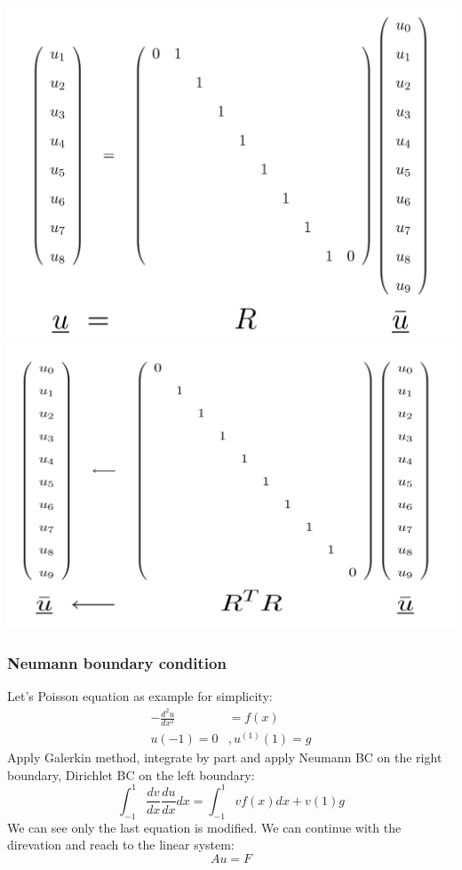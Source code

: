 \documentclass[
  a4paper,
  10pt]{article}
\begin{document}
\includegraphics{figs/dadf8ccf703923cbac91fdb1eac78f62d729367f.png}
\includegraphics{figs/3c1003a64acccf7c33fd9604e81f9c4b75a66a3d.png}

\hypertarget{neumann-boundary-condition}{%
\subsubsection{Neumann boundary
condition}\label{neumann-boundary-condition}}

Let's Poisson equation as example for simplicity: \begin{align}
-\frac{d^2u}{dx^2} &= f(x)\\
u(-1) = 0&,u^{(1)}(1)=g
\end{align} Apply Galerkin method, integrate by part and apply Neumann
BC on the right boundary, Dirichlet BC on the left boundary:
\begin{equation}
\int_{-1}^1\frac{dv}{dx}\frac{du}{dx}dx = \int_{-1}^1 vf(x)dx+v(1)g
\end{equation} We can see only the last equation is modified. We can
continue with the direvation and reach to the linear system:
\begin{equation}
Au=F
\end{equation}
\end{document}
